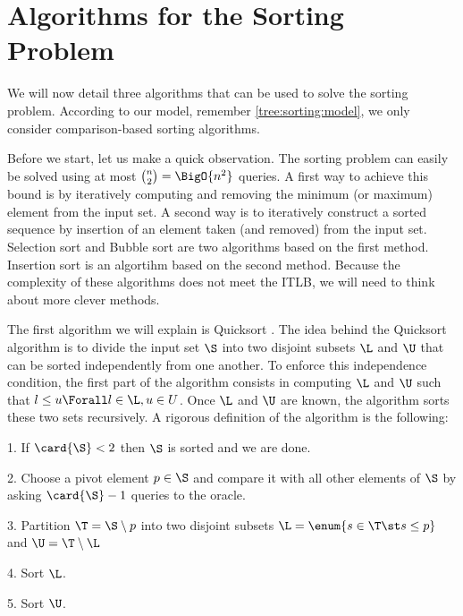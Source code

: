 \section{Algorithms for the Sorting Problem}
\label{tree:sorting:alg}

We will now detail three algorithms that can be used to solve the sorting
problem. According to our model, remember \ref{tree:sorting:model}, we only
consider comparison-based sorting algorithms.

Before we start, let us make a quick observation. The sorting problem can
easily be solved using at most \(\binom{n}{2} = \BigO{n^2}\) queries. A first
way to achieve this bound is by iteratively computing and removing the minimum
(or maximum) element from the input set. A second way is to iteratively
construct a sorted sequence by insertion of an element taken (and removed) from
the input set. Selection sort and Bubble sort are two algorithms based on the
first method. Insertion sort is an algortihm based on the second method.
Because the complexity of these algorithms does not meet the ITLB, we will need
to think about more clever methods.

The first algorithm we will explain is Quicksort \cite{hoare:1962}.
The idea behind the Quicksort algorithm is to divide the input set \(\S\) into
two disjoint subsets \(\L\) and \(\U\) that can be sorted independently from
one another. To enforce this independence condition, the first part of
the algorithm consists in computing \(\L\) and \(\U\) such that \(l \le u \Forall l
\in \L, u \in U\). Once \(\L\) and \(\U\) are known, the algorithm sorts these
two sets recursively. A rigorous definition of the algorithm is the following:

\begin{algorithm}
\item[1.] If \(\card{\S} < 2\) then \(\S\) is sorted and we are done.
\item[2.] Choose a pivot element \(p \in \S\) and compare it with all other
elements of \(\S\) by asking \(\card{\S} - 1\) queries to the oracle.
\item[3.] Partition \(\T = \S \setminus p\) into two disjoint subsets
\(\L = \enum{s \in \T \st s \le p}\) and \(\U = \T \setminus \L\)
\item[4.] Sort \(\L\).
\item[5.] Sort \(\U\).
\end{algorithm}

